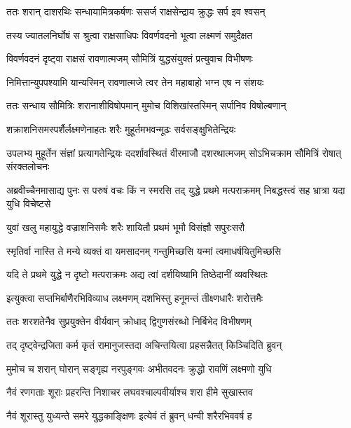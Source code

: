 
\twolineshloka
{ततः शरान् दाशरथिः सन्धायामित्रकर्षणः}
{ससर्ज राक्षसेन्द्राय क्रुद्धः सर्प इव श्वसन्} %

\twolineshloka
{तस्य ज्यातलनिर्घोषं स श्रुत्वा राक्षसाधिपः}
{विवर्णवदनो भूत्वा लक्ष्मणं समुदैक्षत} %

\twolineshloka
{विवर्णवदनं दृष्ट्वा राक्षसं रावणात्मजम्}
{सौमित्रिं युद्धसंयुक्तं प्रत्युवाच विभीषणः} %

\twolineshloka
{निमित्तान्युपपश्यामि यान्यस्मिन् रावणात्मजे}
{त्वर तेन महाबाहो भग्न एष न संशयः} %

\twolineshloka
{ततः सन्धाय सौमित्रिः शरानाशीविषोपमान्}
{मुमोच विशिखांस्तस्मिन् सर्पानिव विषोल्बणान्} %

\twolineshloka
{शक्राशनिसमस्पर्शैर्लक्ष्मणेनाहतः शरैः}
{मुहूर्तमभवन्मूढः सर्वसङ्क्षुभितेन्द्रियः} %

\threelineshloka
{उपलभ्य मुहूर्तेन संज्ञां प्रत्यागतेन्द्रियः}
{ददर्शावस्थितं वीरमाजौ दशरथात्मजम्}
{सोऽभिचक्राम सौमित्रिं रोषात् संरक्तलोचनः} %

\threelineshloka
{अब्रवीच्चैनमासाद्य पुनः स परुषं वचः}
{किं न स्मरसि तद् युद्धे प्रथमे मत्पराक्रमम्}
{निबद्धस्त्वं सह भ्रात्रा यदा युधि विचेष्टसे} %

\twolineshloka
{युवां खलु महायुद्धे वज्राशनिसमैः शरैः}
{शायितौ प्रथमं भूमौ विसंज्ञौ सपुरःसरौ} %

\twolineshloka
{स्मृतिर्वा नास्ति ते मन्ये व्यक्तं वा यमसादनम्}
{गन्तुमिच्छसि यन्मां त्वमाधर्षयितुमिच्छसि} %

\twolineshloka
{यदि ते प्रथमे युद्धे न दृष्टो मत्पराक्रमः}
{अद्य त्वां दर्शयिष्यामि तिष्ठेदानीं व्यवस्थितः} %

\twolineshloka
{इत्युक्त्वा सप्तभिर्बाणैरभिविव्याध लक्ष्मणम्}
{दशभिस्तु हनूमन्तं तीक्ष्णधारैः शरोत्तमैः} %

\twolineshloka
{ततः शरशतेनैव सुप्रयुक्तेन वीर्यवान्}
{क्रोधाद् द्विगुणसंरब्धो निर्बिभेद विभीषणम्} %

\twolineshloka
{तद् दृष्ट्वेन्द्रजिता कर्म कृतं रामानुजस्तदा}
{अचिन्तयित्वा प्रहसन्नैतत् किञ्चिदिति ब्रुवन्} %

\twolineshloka
{मुमोच च शरान् घोरान् सङ्गृह्य नरपुङ्गवः}
{अभीतवदनः क्रुद्धो रावणिं लक्ष्मणो युधि} %

\twolineshloka
{नैवं रणगताः शूराः प्रहरन्ति निशाचर}
{लघवश्चाल्पवीर्याश्च शरा हीमे सुखास्तव} %

\twolineshloka
{नैवं शूरास्तु युध्यन्ते समरे युद्धकाङ्क्षिणः}
{इत्येवं तं ब्रुवन् धन्वी शरैरभिववर्ष ह} %

